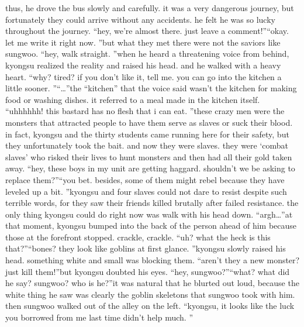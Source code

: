  thus, he drove the bus slowly and carefully.
 it was a very dangerous journey, but fortunately they could arrive without any accidents.
 he felt he was so lucky throughout the journey.
“hey, we’re almost there.
 just leave a comment!”“okay.
 let me write it right now.
”but what they met there were not the saviors like sungwoo.
“hey, walk straight.
”when he heard a threatening voice from behind, kyongsu realized the reality and raised his head.
 and he walked with a heavy heart.
“why? tired? if you don’t like it, tell me.
 you can go into the kitchen a little sooner.
”“…”the “kitchen” that the voice said wasn’t the kitchen for making food or washing dishes.
it referred to a meal made in the kitchen itself.
“uhhhhhh! this bastard has no flesh that i can eat.
”these crazy men were the monsters that attracted people to have them serve as slaves or suck their blood.
in fact, kyongsu and the thirty students came running here for their safety, but they unfortunately took the bait.
 and now they were slaves.
 they were ‘combat slaves’ who risked their lives to hunt monsters and then had all their gold taken away.
“hey, these boys in my unit are getting haggard.
 shouldn’t we be asking to replace them?”“you bet.
 besides, some of them might rebel because they have leveled up a bit.
”kyongsu and four slaves could not dare to resist despite such terrible words, for they saw their friends killed brutally after failed resistance.
 the only thing kyongsu could do right now was walk with his head down.
“argh…”at that moment, kyongsu bumped into the back of the person ahead of him because those at the forefront stopped.
crackle, crackle.
“uh? what the heck is this that?”“bones? they look like goblins at first glance.
”kyongsu slowly raised his head.
 something white and small was blocking them.
“aren’t they a new monster? just kill them!”but kyongsu doubted his eyes.
“hey, sungwoo?”“what? what did he say? sungwoo? who is he?”it was natural that he blurted out loud, because the white thing he saw was clearly the goblin skeletons that sungwoo took with him.
 then sungwoo walked out of the alley on the left.
“kyongsu, it looks like the luck you borrowed from me last time didn’t help much.
”

